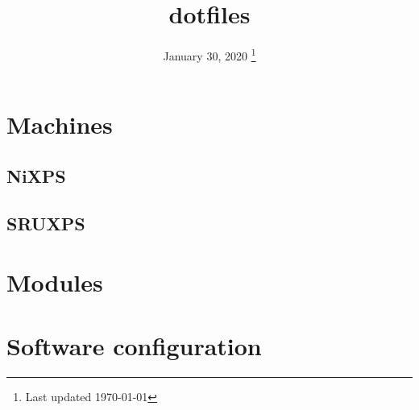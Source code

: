 \documentclass[a4paper,titlepage,xelatex]{tufte-book}
\title{dotfiles}
\date{%
  January 30, 2020
  \thanks{Last updated \today}
}
\begin{document}
\frontmatter
\maketitle
\tableofcontents
\mainmatter

\newpage

\chapter{Machines}
\section{NiXPS}


\section{SRUXPS}



\chapter{Modules}






\chapter{Software configuration}



















\backmatter



\printglossaries

\nocite{*}



\newpage
\listoftodos[To-Do]
\end{document}
